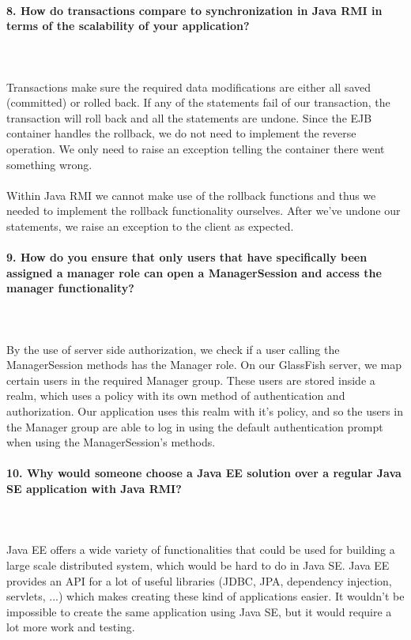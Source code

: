 \documentclass{ds-report}
\begin{document}
	\paragraph{8. How do transactions compare to synchronization in Java RMI in terms of the scalability of your application?} \mbox{}\\\\
Transactions make sure the required data modifications are either all saved (committed) or rolled back. If any of the statements fail of our transaction, the transaction will roll back and all the statements are undone. Since the EJB container handles the rollback, we do not need to implement the reverse operation. We only need to raise an exception telling the container there went something wrong.\mbox{}\\\\
Within Java RMI we cannot make use of the rollback functions and thus we needed to implement the rollback functionality ourselves. After we've undone our statements, we raise an exception to the client as expected.





	\paragraph{9. How do you ensure that only users that have specifically been assigned a manager role can open a ManagerSession and access the manager functionality?} \mbox{}\\\\
By the use of server side authorization, we check if a user calling the ManagerSession methods has the Manager role. On our GlassFish server, we map certain users in the required Manager group. These users are stored inside a realm, which uses a policy with its own method of authentication and authorization. Our application uses this realm with it's policy, and so the users in the Manager group are able to log in using the default authentication prompt when using the ManagerSession's methods. 







	\paragraph{10.  Why would someone choose a Java EE solution over a regular Java SE application with Java RMI?} \mbox{}\\\\
Java EE offers a wide variety of functionalities that could be used for building a large scale distributed system, which would be hard to do in Java SE. Java EE provides an API for a lot of useful libraries (JDBC, JPA, dependency injection, servlets, ...) which makes creating these kind of applications easier. It wouldn't be impossible to create the same application using Java SE, but it would require a lot more work and testing. 


	
	\clearpage

	
\end{document}
